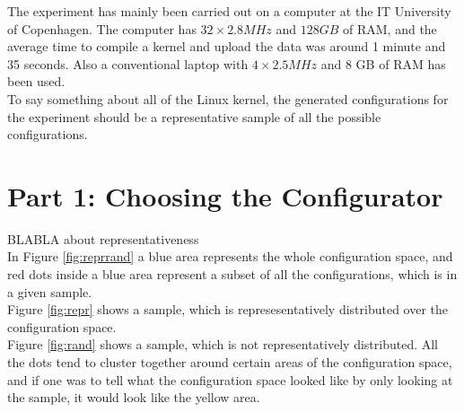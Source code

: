 \documentclass[a4paper,11pt]{report}
\begin{document}
The experiment has mainly been carried out on a computer at the IT University 
of Copenhagen. The computer has $32\times2.8 MHz$ and $128 GB$ of RAM, and the 
average time to compile a kernel and upload the data was around 1 minute and 35 
seconds. Also a conventional laptop with $4\times2.5 MHz$  and 8 GB of RAM has 
been used.
\\

To say something about all of the Linux kernel, the generated configurations 
for the experiment should be a representative sample of all the possible 
configurations. 



        \section{Part 1: Choosing the Configurator}
        \label{rephunt}

BLABLA about representativeness
\\


In Figure \ref{fig:reprrand} a blue area represents the whole configuration 
space, and red dots inside a blue area represent a subset of all the 
configurations, which is in a given sample.
\\

Figure \ref{fig:repr} shows a sample, which is represesentatively distributed 
over the configuration space. 
\\

Figure \ref{fig:rand} shows a sample, which is not representatively 
distributed. All the dots tend to cluster together around certain areas of the 
configuration space, and if one was to tell what the configuration space looked 
like by only looking at the sample, it would look like the yellow area.
\end{document}
